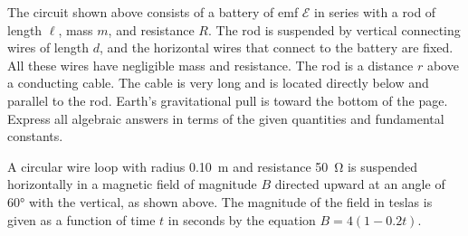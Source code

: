 \documentclass{../../../oss-apphys-exam}
\begin{document}
\begin{questions}
  \question The circuit shown above consists of a battery of emf $\mathcal{E}$
  in series with a rod of length $\ell$, mass $m$, and resistance $R$. The rod
  is suspended by vertical connecting wires of length $d$, and the horizontal
  wires that connect to the battery are fixed. All these wires have negligible
  mass and resistance. The rod is a distance $r$ above a conducting cable. The
  cable is very long and is located directly below and parallel to the rod.
  Earth's gravitational pull is toward the bottom of the page. Express all
  algebraic answers in terms of the given quantities and fundamental constants.
  \newpage
  
  \question A circular wire loop with radius \SI{.10}{\metre} and resistance
  \SI{50}{\ohm} is suspended horizontally in a magnetic field of magnitude $B$
  directed upward at an angle of \ang{60} with the vertical, as shown above.
  The magnitude of the field in teslas is given as a function of time $t$ in
  seconds by the equation $B=4(1-0.2t)$.
  \begin{parts}

\end{parts}
\end{questions}
\end{document}
